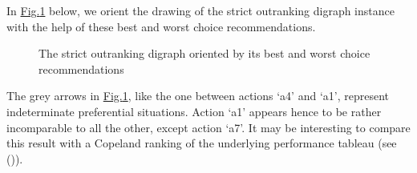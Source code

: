 \documentclass[a4paper,10pt,english]{sphinxhowto}
\let\sphinxpxdimen\pdfpxdimen\else\newdimen\sphinxpxdimen
\begin{document}
In \hyperref[\detokenize{tutorial:bestworstorientation}]{Fig.\@ \ref{\detokenize{tutorial:bestworstorientation}}} below, we orient the drawing of the strict outranking digraph instance with the help of these best and worst choice recommendations.

\begin{sphinxVerbatim}[commandchars=\\\{\},numbers=left,firstnumber=1,stepnumber=1]
      \PYG{p}{[}\PYG{p}{]} \PYG{p}{[}\PYG{p}{]}
\end{sphinxVerbatim}

\begin{figure}[htbp]
\centering
\capstart

\noindent\sphinxincludegraphics[width=300\sphinxpxdimen]{{bestWorstOrientation}.png}
\caption{The strict outranking digraph oriented by its best and worst choice recommendations}\label{\detokenize{tutorial:bestworstorientation}}\end{figure}

The grey arrows in \hyperref[\detokenize{tutorial:bestworstorientation}]{Fig.\@ \ref{\detokenize{tutorial:bestworstorientation}}}, like the one between actions ‘a4’ and ‘a1’, represent indeterminate preferential situations. Action ‘a1’ appears hence to be rather incomparable to all the other, except action ‘a7’. It may be interesting to compare this result with a Copeland ranking of the underlying performance tableau (see {\hyperref[\detokenize{tutorial:ranking-tutorial-label}]{}} ()).

\begin{sphinxVerbatim}[commandchars=\\\{\},numbers=left,firstnumber=1,stepnumber=1]
 
          
\end{sphinxVerbatim}
\end{document}

